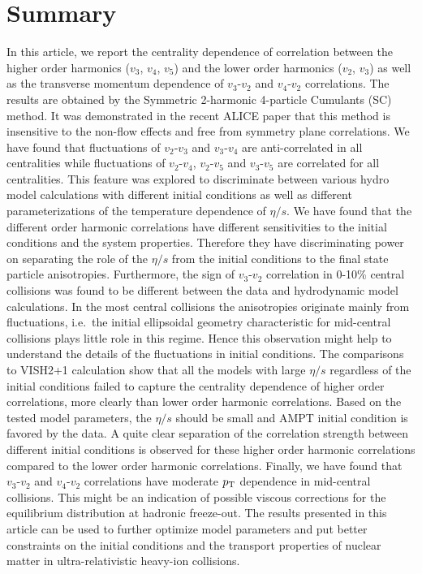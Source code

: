\section{Summary}
\label{sec:summary}
In this article, we report the centrality dependence of correlation between the higher order harmonics ($v_3$, $v_4$, $v_5$) and the lower order harmonics ($v_2$, $v_3$) as well as the transverse momentum dependence of $v_3$-$v_2$ and $v_4$-$v_2$ correlations.
The results are obtained by the Symmetric 2-harmonic 4-particle Cumulants (SC) method. It was demonstrated in the recent ALICE paper that this method is insensitive to the non-flow effects and free from symmetry plane correlations.
We have found that fluctuations of $v_2$-$v_3$ and $v_3$-$v_4$ are anti-correlated in all centralities while fluctuations of $v_2$-$v_4$, $v_2$-$v_5$ and $v_3$-$v_5$ are correlated for all centralities. 
This feature was explored to discriminate between various hydro model calculations with different initial conditions as well as different parameterizations of the temperature dependence of $\eta/s$.
We have found that the different order harmonic correlations have different sensitivities to the initial conditions and the system properties. Therefore they have discriminating power on separating the role of the $\eta/s$  from the initial conditions to the final state particle anisotropies.
Furthermore, the sign of $v_3$-$v_2$ correlation in 0-10\% central collisions was found to be different between the data and hydrodynamic model calculations.
In the most central collisions the anisotropies originate mainly from fluctuations, i.e.\ the initial ellipsoidal geometry characteristic for mid-central collisions plays little role in this regime. Hence this observation might help to understand the details of the fluctuations in initial conditions. 
The comparisons to VISH2+1 calculation show that all the models with large $\eta/s$ regardless of the initial conditions failed to capture the centrality dependence of higher order correlations, more clearly than lower order harmonic correlations. 
Based on the tested model parameters, the $\eta/s$ should be small and AMPT initial condition is favored by the data. A quite clear separation of the correlation strength between different initial conditions is observed for these higher order harmonic correlations compared to the lower order harmonic correlations.
Finally, we have found that $v_3$-$v_2$ and $v_4$-$v_2$ correlations have moderate $p_{\rm T}$ dependence in mid-central collisions. This might be an indication of possible viscous corrections for the equilibrium distribution at hadronic freeze-out.
The results presented in this article can be used to further optimize model parameters and put better constraints on the initial conditions and the transport properties of nuclear matter in ultra-relativistic heavy-ion collisions.

